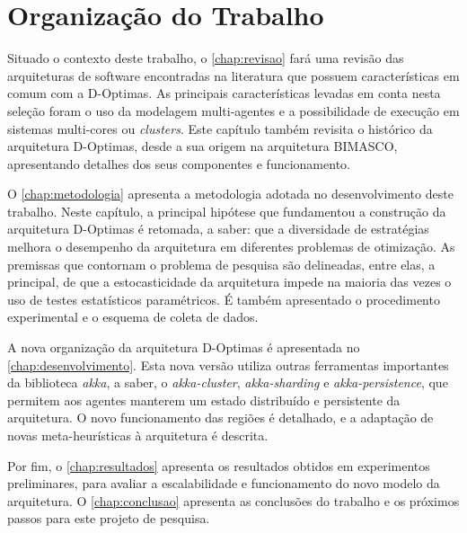 \section{Organização do Trabalho}

Situado o contexto deste trabalho, o \autoref{chap:revisao} fará uma revisão das arquiteturas de software encontradas na literatura que possuem características em comum com a D-Optimas. As principais características levadas em conta nesta seleção foram o uso da modelagem multi-agentes e a possibilidade de execução em sistemas multi-cores ou \textit{clusters}. Este capítulo também revisita o histórico da arquitetura D-Optimas, desde a sua origem na arquitetura BIMASCO, apresentando detalhes dos seus componentes e funcionamento. 

O \autoref{chap:metodologia} apresenta a metodologia adotada no desenvolvimento deste trabalho. Neste capítulo, a principal hipótese que fundamentou a construção da arquitetura D-Optimas é retomada, a saber: que a diversidade de estratégias melhora o desempenho da arquitetura em diferentes problemas de otimização. As premissas que contornam o problema de pesquisa são delineadas, entre elas, a principal, de que a estocasticidade da arquitetura impede na maioria das vezes o uso de testes estatísticos paramétricos. É também apresentado o procedimento experimental e o esquema de coleta de dados.

A nova organização da arquitetura D-Optimas é apresentada no \autoref{chap:desenvolvimento}. Esta nova versão utiliza outras ferramentas importantes da biblioteca \textit{akka}, a saber, o \textit{akka-cluster}, \textit{akka-sharding} e \textit{akka-persistence}, que permitem aos agentes manterem um estado distribuído e persistente da arquitetura. O novo funcionamento das regiões é detalhado, e a adaptação de novas meta-heurísticas à arquitetura é descrita.

Por fim, o \autoref{chap:resultados} apresenta os resultados obtidos em experimentos preliminares, para avaliar a escalabilidade e funcionamento do novo modelo da arquitetura. O \autoref{chap:conclusao} apresenta as conclusões do trabalho e os próximos passos para este projeto de pesquisa. 
